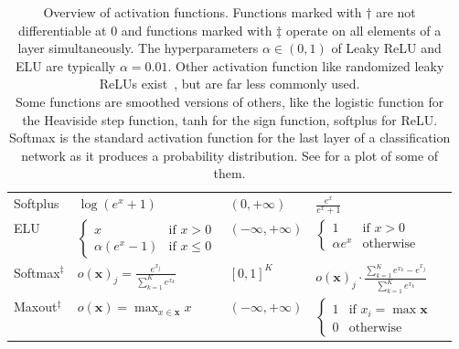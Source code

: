 \begin{table}[H]
\begin{tabular}{lllll}
    Softplus                 & $\log(e^x + 1)$                                & $(0, +\infty)$                                       & $\frac{e^x}{e^x + 1}$    \\%
    \gls{ELU}                & $\begin{cases}x &\text{if } x > 0\\\alpha (e^x - 1) &\text{if } x \leq 0\end{cases}$ & $(-\infty, +\infty)$ & $\begin{cases}1 &\text{if } x > 0\\\alpha e^x &\text{otherwise}\end{cases}$ \\%
    Softmax$^\ddagger$       & $o(\mathbf{x})_j = \frac{e^{x_j}}{\sum_{k=1}^K e^{x_k}}$    & $[0, 1]^K$                                           & $o(\mathbf{x})_j \cdot \frac{\sum_{k=1}^K e^{x_k} - e^{x_j}}{\sum_{k=1}^K e^{x_k}}$          \\%
    Maxout$^\ddagger$        & $o(\mathbf{x}) = \max_{x \in \mathbf{x}} x$                 & $(-\infty, +\infty)$                                 & $\begin{cases}1 &\text{if } x_i = \max \mathbf{x}\\0 &\text{otherwise}\end{cases}$          \\%
    \bottomrule
    \end{tabular}
    \caption[Activation functions]{Overview of activation functions. Functions
             marked with $\dagger$ are not differentiable at 0 and functions
             marked with $\ddagger$ operate on all elements of a layer
             simultaneously. The hyperparameters $\alpha \in (0, 1)$ of Leaky
             ReLU and ELU are typically $\alpha = 0.01$. Other activation
             function like randomized leaky ReLUs exist~\cite{xu2015empirical},
             but are far less commonly used.\\
             Some functions are smoothed versions of others, like the logistic
             function for the Heaviside step function, tanh for the sign
             function, softplus for ReLU.\\
             Softmax is the standard activation function for the last layer of
             a classification network as it produces a probability
             distribution. See  for a plot
             of some of them.}
    \label{table:activation-functions-overview}
\end{table}


